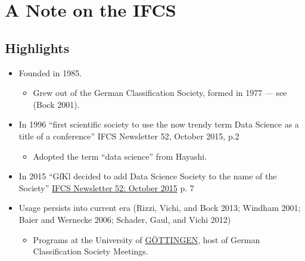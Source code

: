 \documentclass[
  letterpaper,
]{report}
\providecommand{\tightlist}{%
  \setlength{\itemsep}{0pt}\setlength{\parskip}{0pt}}\usepackage{longtable,booktabs,array}
\begin{document}
\hypertarget{a-note-on-the-ifcs}{%
\section{A Note on the IFCS}\label{a-note-on-the-ifcs}}

\hypertarget{highlights}{%
\subsection{Highlights}\label{highlights}}

\begin{itemize}
\tightlist
\item
  Founded in 1985.

  \begin{itemize}
  \tightlist
  \item
    Grew out of the German Classification Society, formed in 1977 ---
    see (Bock 2001).
  \end{itemize}
\item
  In 1996 ``first scientific society to use the now trendy term Data
  Science as a title of a conference'' IFCS Newsletter 52, October 2015,
  p.2

  \begin{itemize}
  \tightlist
  \item
    Adopted the term ``data science'' from Hayashi.
  \end{itemize}
\item
  In 2015 ``GfKl decided to add Data Science Society to the name of the
  Society''
  \href{https://ifcs.boku.ac.at/site/lib/exe/fetch.php?media=newsletter_archive:ifcs-newsletter-52.pdf}{IFCS
  Newsletter 52: October 2015} p. 7
\item
  Usage persists into current era (Rizzi, Vichi, and Bock 2013; Windham
  2001; Baier and Wernecke 2006; Schader, Gaul, and Vichi 2012)

  \begin{itemize}
  \tightlist
  \item
    Programs at the University of
    \href{https://www.uni-goettingen.de/}{GÖTTINGEN}, host of German
    Classification Society Meetings.


\end{itemize}
\end{itemize}
\end{document}
